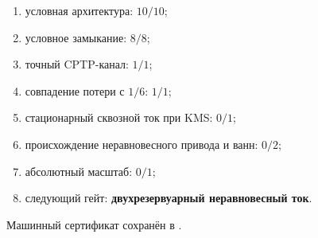 \begin{protocol}\begin{enumerate}
\item условная архитектура: \textbf{$10/10$};
\item условное замыкание: \textbf{$8/8$};
\item точный CPTP-канал: \textbf{$1/1$};
\item совпадение потери с $1/6$: \textbf{$1/1$};
\item стационарный сквозной ток при KMS: \textbf{$0/1$};
\item происхождение неравновесного привода и ванн: \textbf{$0/2$};
\item абсолютный масштаб: \textbf{$0/1$};
\item следующий гейт: \textbf{двухрезервуарный неравновесный ток}.
\end{enumerate}\end{protocol}

Машинный сертификат сохранён в
.
